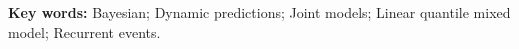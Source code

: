 
{\bf Key words:} Bayesian; Dynamic predictions; Joint models; Linear quantile mixed model; Recurrent events.